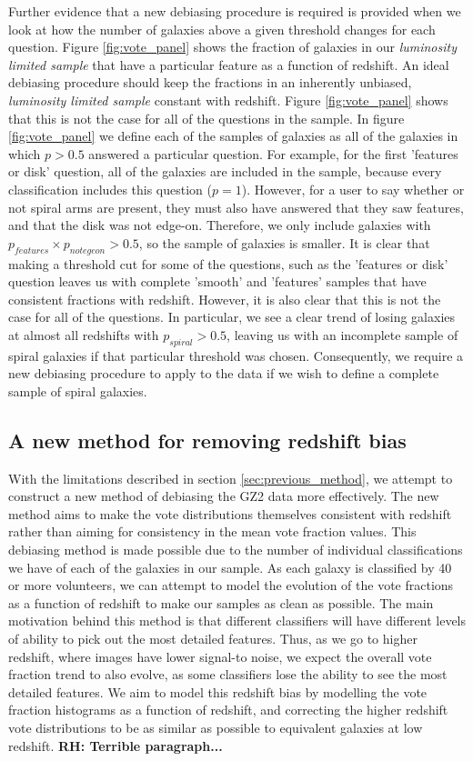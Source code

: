 \documentclass[useAMS,usenatbib]{mn2e}
\newcommand{\rh}[1]{{\bf \textcolor{RoyalPurple}{RH: #1}}}
\begin{document}
Further evidence that a new debiasing procedure is required is provided when we look at how the number of galaxies above a given threshold changes for each question. Figure \ref{fig:vote_panel} shows the fraction of galaxies in our \textit{luminosity limited sample} that have a particular feature as a function of redshift. An ideal debiasing procedure should keep the fractions in an inherently unbiased, \textit{luminosity limited sample} constant with redshift. Figure \ref{fig:vote_panel} shows that this is not the case for all of the questions in the sample. In figure \ref{fig:vote_panel} we define each of the samples of galaxies as all of the galaxies in which $p>0.5$ answered a particular question. For example, for the first 'features or disk' question, all of the galaxies are included in the sample, because every classification includes this question ($p=1$). However, for a user to say whether or not spiral arms are present, they must also have answered that they saw features, and that the disk was not edge-on. Therefore, we only include galaxies with $p_{features} \times p_{not ege on} > 0.5$, so the sample of galaxies is smaller. It is clear that making a threshold cut for some of the questions, such as the 'features or disk' question leaves us with complete 'smooth' and 'features' samples that have consistent fractions with redshift. However, it is also clear that this is not the case for all of the questions. In particular, we see a clear trend of losing galaxies at almost all redshifts with $p_{spiral} > 0.5$, leaving us with an incomplete sample of spiral galaxies if that particular threshold was chosen. Consequently, we require a new debiasing procedure to apply to the data if we wish to define a complete sample of spiral galaxies. 

\subsection{A new method for removing redshift bias}
\label{sec:new_method}

With the limitations described in section \ref{sec:previous_method}, we attempt to construct a new method of debiasing the GZ2 data more effectively. The new method aims to make the vote distributions themselves consistent with redshift rather than aiming for consistency in the mean vote fraction values. This debiasing method is made possible due to the number of individual classifications we have of each of the galaxies in our sample. As each galaxy is classified by 40 or more volunteers, we can attempt to model the evolution of the vote fractions as a function of redshift to make our samples as clean as possible. The main motivation behind this method is that different classifiers will have different levels of ability to pick out the most detailed features. Thus, as we go to higher redshift, where images have lower signal-to noise, we expect the overall vote fraction trend to also evolve, as some classifiers lose the ability to see the most detailed features. We aim to model this redshift bias by modelling the vote fraction histograms as a function of redshift, and correcting the higher redshift vote distributions to be as similar as possible to equivalent galaxies at low redshift. \rh{Terrible paragraph...}
\end{document}
